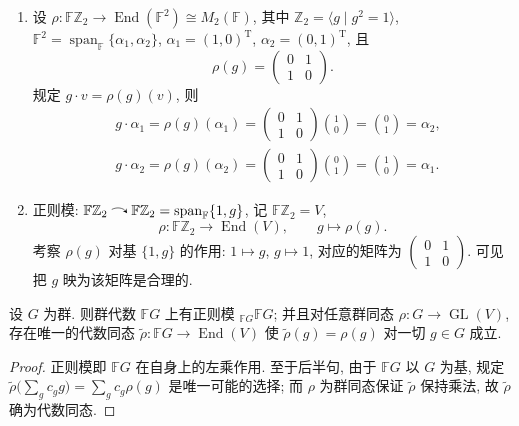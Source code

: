 \begin{example}\label{ex:FZ2-representation-model}
\mbox{}\par\vspace{-0.2em}
\begin{enumerate}
  \item 设 $\rho\colon \mathbb{F}\mathbb{Z}_2\to\operatorname{End}(\mathbb{F}^2)\cong M_2(\mathbb{F})$, 其中
  $\mathbb{Z}_2=\langle g\mid g^2=1\rangle$, $\mathbb{F}^2=\operatorname{span}_{\mathbb{F}}\{\alpha_1,\alpha_2\}$,
  $\alpha_1=(1,0)^{\mathrm{T}}$, $\alpha_2=(0,1)^{\mathrm{T}}$, 且
  \[
    \rho(g)=\begin{pmatrix}0&1\\1&0\end{pmatrix}.
  \]
  规定 $g\cdot v=\rho(g)(v)$, 则
  \[
    \begin{aligned}
      &g\cdot\alpha_1=\rho(g)(\alpha_1)=\begin{pmatrix}0&1\\1&0\end{pmatrix}\binom10=\binom01=\alpha_2,\\
      &g\cdot\alpha_2=\rho(g)(\alpha_2)=\begin{pmatrix}0&1\\1&0\end{pmatrix}\binom01=\binom10=\alpha_1 .
    \end{aligned}
  \]
  \item 正则模: $\mathbb{F}\mathbb{Z}_2\acts \mathbb{F}\mathbb{Z}_2=\operatorname{span}_{\mathbb{F}}\{1,g\}$, 记 $\mathbb{F}\mathbb{Z}_2=V$,
  \[
    \rho\colon \mathbb{F}\mathbb{Z}_2\longrightarrow\operatorname{End}(V),\qquad g\longmapsto\rho(g).
  \]
  考察 $\rho(g)$ 对基 $\{1,g\}$ 的作用: $1\mapsto g$, $g\mapsto 1$, 对应的矩阵为
  $\begin{pmatrix}0&1\\1&0\end{pmatrix}$. 可见把 $g$ 映为该矩阵是合理的.
\end{enumerate}
\end{example}

\begin{proposition}\label{prop:regular-module-exists}
设 $G$ 为群. 则群代数 $\mathbb{F}G$ 上有正则模 ${}_{\mathbb{F}G}\mathbb{F}G$; 并且对任意群同态
$\rho\colon G\to\operatorname{GL}(V)$, 存在唯一的代数同态 $\widetilde\rho\colon\mathbb{F}G\to\operatorname{End}(V)$
使 $\widetilde\rho(g)=\rho(g)$ 对一切 $g\in G$ 成立.
\end{proposition}

\begin{proof}
正则模即 $\mathbb{F}G$ 在自身上的左乘作用. 至于后半句, 由于 $\mathbb{F}G$ 以 $G$ 为基,
规定 $\widetilde\rho\bigl(\sum_g c_g g\bigr)=\sum_g c_g\rho(g)$ 是唯一可能的选择;
而 $\rho$ 为群同态保证 $\widetilde\rho$ 保持乘法, 故 $\widetilde\rho$ 确为代数同态.
\end{proof}


